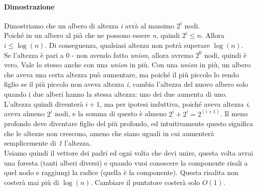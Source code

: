 \paragraph{Dimostrazione}
Dimostriamo che un albero di altezza \textit{i} avrà al massimo $2^i$ nodi. \\
Poiché in un albero al pià che ne possono essere \textit{n}, quindi $2^i \le n$. Allora $i \le \log(n)$. Di conseguenza, qualsiasi altezza non potrà superare $\log(n)$. \\
Se l'altezza è pari a 0 - non avendo fatto \textit{union}, allora avremo $2^0$ nodi, quindi è vero. Vale lo stesso anche con una \textit{union} in più. Con una \textit{union} in più, un albero che aveva una certa altezza può aumentare, ma poiché il più piccolo lo rendo figlio se il più piccolo non aveva altezza \textit{i}, cambia l'altezza del nuovo albero solo quando i due alberi hanno la stessa altezza: uno dei due aumenta di uno. L'altezza quindi diventerà $i+1$, ma per ipotesi induttiva, poiché aveva altezza \textit{i}, aveva almeno $2^i$ nodi, e la somma di questo è almeno $2^i + 2^i = 2^(i+1)$. Il meno profondo deve diventare figlio del più profondo, ed intuitivamente questo significa che le altezze non crescono, ameno che siano uguali in cui aumenterà semplicemente di \textit{1} l'altezza. \\
Usiamo quindi il vettore dei padri ed ogni volta che devi unire, questa volta avrai una foresta (tanti alberi diversi) e quando vuoi conoscere la componente risali a quel nodo e raggiungi la radice (quella è la componente). Questa risalita non costerà mai più di $\log(n)$. Cambiare il puntatore costerà solo $O(1)$.